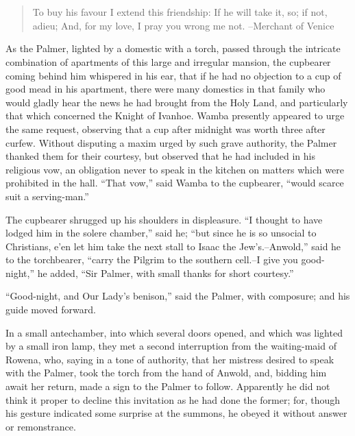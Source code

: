 \chapter{}

\begin{quote}
To buy his favour I extend this friendship:
If he will take it, so; if not, adieu;
And, for my love, I pray you wrong me not.
--Merchant of Venice
\end{quote}

As the Palmer, lighted by a domestic with a torch, passed through the
intricate combination of apartments of this large and irregular mansion,
the cupbearer coming behind him whispered in his ear, that if he had no
objection to a cup of good mead in his apartment, there were many
domestics in that family who would gladly hear the news he had brought
from the Holy Land, and particularly that which concerned the Knight of
Ivanhoe. Wamba presently appeared to urge the same request, observing
that a cup after midnight was worth three after curfew. Without
disputing a maxim urged by such grave authority, the Palmer thanked them
for their courtesy, but observed that he had included in his religious
vow, an obligation never to speak in the kitchen on matters which were
prohibited in the hall. ``That vow,'' said Wamba to the cupbearer,
``would scarce suit a serving-man.''

The cupbearer shrugged up his shoulders in displeasure. ``I thought to
have lodged him in the solere chamber,'' said he; ``but since he is so
unsocial to Christians, e'en let him take the next stall to Isaac the
Jew's.--Anwold,'' said he to the torchbearer, ``carry the Pilgrim to the
southern cell.--I give you good-night,'' he added, ``Sir Palmer, with
small thanks for short courtesy.''

``Good-night, and Our Lady's benison,'' said the Palmer, with composure;
and his guide moved forward.

In a small antechamber, into which several doors opened, and which was
lighted by a small iron lamp, they met a second interruption from the
waiting-maid of Rowena, who, saying in a tone of authority, that her
mistress desired to speak with the Palmer, took the torch from the hand
of Anwold, and, bidding him await her return, made a sign to the Palmer
to follow. Apparently he did not think it proper to decline this
invitation as he had done the former; for, though his gesture indicated
some surprise at the summons, he obeyed it without answer or
remonstrance.

